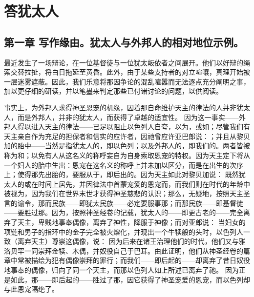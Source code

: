 
\chapter{答犹太人}



\section{第一章 写作缘由。犹太人与外邦人的相对地位示例。}

最近发生了一场辩论，在一位基督徒与一位犹太皈依者之间展开。他们以好辩的绳索交替拉扯，将白日拖延至黄昏。此外，由于某些支持者的对立喧嚷，真理开始被一层迷雾遮蔽。因此，我们乐意将那因争论的混乱喧嚣而无法逐点充分阐明之事，加以更仔细的研读，并以笔墨来判定那些已付诸讨论的问题，以供阅读。\par

事实上，为外邦人求得神圣恩宠的机缘，因着那自命维护天主的律法的人并非犹太人，而是外邦人，并非的犹太人，而获得了卓越的适宜性。 因为这一事实——外邦人得以进入天主的律法——已足以阻止以色列人自夸，以为，或如；尽管我们有天主亲自作为充足的担保者和信实的应许者，因祂曾应许亚巴郎说：；并且从黎贝加的胎中——当然是指犹太人的，即以色列；以及外邦人的，即我们的。两者皆被称为和；以免有人从这名义的称呼妄自为自身索取恩宠的特权。因为天主定下将从一个妇人的胎中生出：恩宠在这名义的称呼上并未加以区分，而是在出生的次序上；使得那先出胎的，要服从于，即后出的。因为天主如此对黎贝加说： 既然犹太人的或在时间上居先，并因律法中首蒙宠爱的恩宠而，而我们则在时代的年龄中被视为，因为我们在世界末世才获得神圣慈悲的认识；那么，无疑地，按照天主圣言的谕令，那而民族——即犹太民族——必定要服事那；而那民族——即基督徒——要胜过那。因为，按照神圣经卷的记载，犹太人的——即更古老的——完全离弃了天主，卑贱地事奉偶像，离弃了神性，降服于神像；而对亚郎说： 当妇女的项链和男子的指环中的金子完全被火熔化，并现出一个牛犊般的头时，以色列人一致（离弃天主）尊崇这偶像，说： 因为后来在诸王治理他们的时代，他们又与雅洛贝罕一同崇拜金犊、木偶，并奴役自己于巴耳。由此证明，他们从神圣经卷的篇章中常被描绘为犯有偶像崇拜的罪行；而我们——即后起的——却离弃了昔日奴役地事奉的偶像，归向了同一个天主，而那以色列人如上所述已离弃了祂。 因为正是如此，那——即后起的——胜过了那，因它获得了神圣宠爱的恩宠，而以色列却与此恩宠隔绝了。\par

